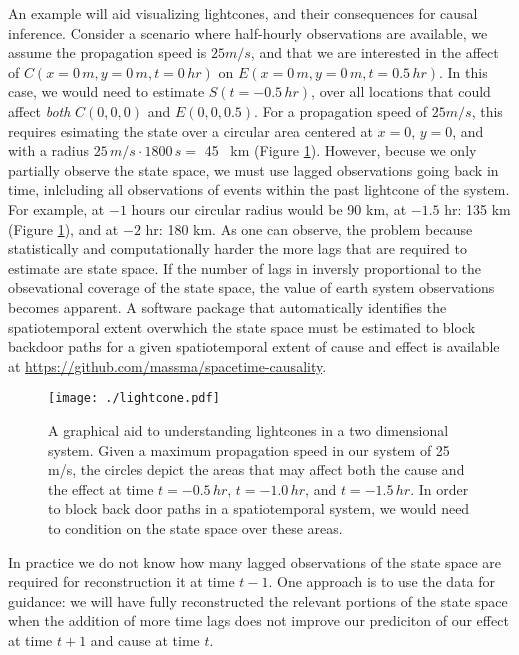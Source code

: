 \documentclass[12pt]{article}
\begin{document}
An example will aid visualizing lightcones, and their consequences for
causal inference. Consider a scenario where half-hourly observations
are available, we assume the propagation speed is $25 m/s$, and that
we are interested in the affect of $C(x=0 \, m, y=0 \, m, t=0 \, hr)$
on $E(x=0 \, m, y=0 \, m , t=0.5 \, hr)$. In this case, we would need
to estimate $S(t=-0.5 \, hr)$, over all locations that could affect
\emph{both} $C(0,0,0)$ and $E(0,0,0.5)$.  For a propagation speed of
$25 m/s$, this requires esimating the state over a circular area
centered at $x=0$, $y=0$, and with a radius
$25 \, m/s \cdot 1800 \, s = $ 45 \, km (Figure
\ref{fig:lightcone}). However, becuse we only partially observe the
state space, we must use lagged observations going back in time,
inlcluding all observations of events within the past lightcone of the
system. For example, at $-1$ hours our circular radius would be 90 km,
at $-1.5$ hr: 135 km (Figure \ref{fig:lightcone}), and at $-2$ hr: 180
km. As one can observe, the problem because statistically and
computationally harder the more lags that are required to estimate are
state space. If the number of lags in inversly proportional to the
obsevational coverage of the state space, the value of earth system
observations becomes apparent. A software package that automatically
identifies the spatiotemporal extent overwhich the state space must be
estimated to block backdoor paths for a given spatiotemporal extent of
cause and effect is available at
\url{https://github.com/massma/spacetime-causality}.

\begin{figure}
  \texttt{[image: ./lightcone.pdf]}
  \caption{A graphical aid to understanding lightcones in a two
    dimensional system. Given a maximum propagation speed in our
    system of 25 m/s, the circles depict the areas that may affect
    both the cause and the effect at time $t=-0.5 \, hr$,
    $t=-1.0 \, hr$, and $t=-1.5 \, hr$. In order to block back door
    paths in a spatiotemporal system, we would need to condition on
    the state space over these areas.}
  \label{fig:lightcone}
\end{figure}

In practice we do not know how many lagged observations of the state
space are required for reconstruction it at time $t-1$. One approach
is to use the data for guidance: we will have fully reconstructed the
relevant portions of the state space when the addition of more time
lags does not improve our prediciton of our effect at time \(t+1\) and
cause at time $t$.
\end{document}
